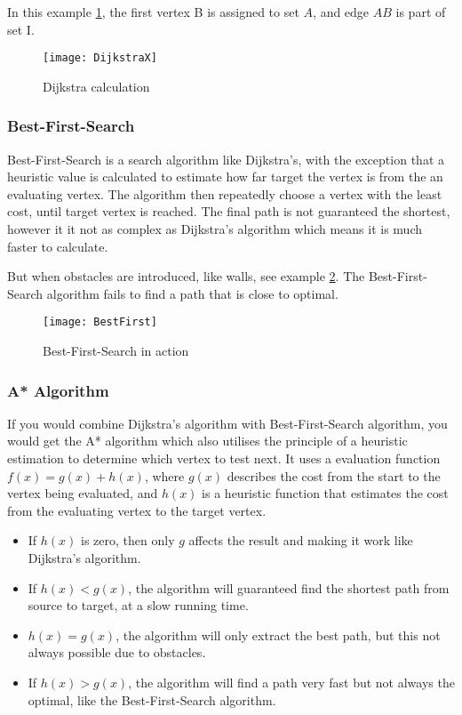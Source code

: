   In this example \cref{fig:dijkstra_calc}, the first vertex B is assigned to set $A$, and edge $AB$ is part of set \RN{1}.

  \begin{figure}[ht!]
    \centering
    \texttt{[image: DijkstraX]}
    \caption{Dijkstra calculation}
    \label{fig:dijkstra_calc}
  \end{figure}

  \subsubsection{Best-First-Search}

  Best-First-Search is a search algorithm like Dijkstra's, with the exception that a heuristic value is calculated to estimate how far target the vertex is from the an evaluating vertex. The algorithm then repeatedly choose a vertex with the least cost, until target vertex is reached. The final path is not guaranteed the shortest, however it it not as complex as Dijkstra's algorithm which means it is much faster to calculate. \cite{BestFirst}

  But when obstacles are introduced, like walls, see example \cref{bestfirst}. The Best-First-Search algorithm fails to find a path that is close to optimal.

  \begin{figure}[ht!]
    \centering
    \texttt{[image: BestFirst]} 
    \caption{Best-First-Search in action}
    \label{bestfirst}
  \end{figure}

  \subsubsection{A* Algorithm}

  If you would combine Dijkstra's algorithm with Best-First-Search algorithm, you would get the A* algorithm which also utilises the principle of a heuristic estimation to determine which vertex to test next. It uses a evaluation function $f(x) = g(x) + h(x)$, where $g(x)$ describes the cost from the start to the vertex being evaluated, and $h(x)$ is a heuristic function that estimates the cost from the evaluating vertex to the target vertex. \cite{http://theory.stanford.edu/}

  \begin{itemize}
    \item If $h(x)$ is zero, then only $g$ affects the result and making it work like Dijkstra's algorithm.

    \item If $h(x) < g(x)$, the algorithm will guaranteed find the shortest path from source to target, at a slow running time.

    \item $h(x) = g(x)$, the algorithm will only extract the best path, but this not always possible due to obstacles.

    \item If $h(x) > g(x)$, the algorithm will find a path very fast but not always the optimal, like the Best-First-Search algorithm.
  \end{itemize}

